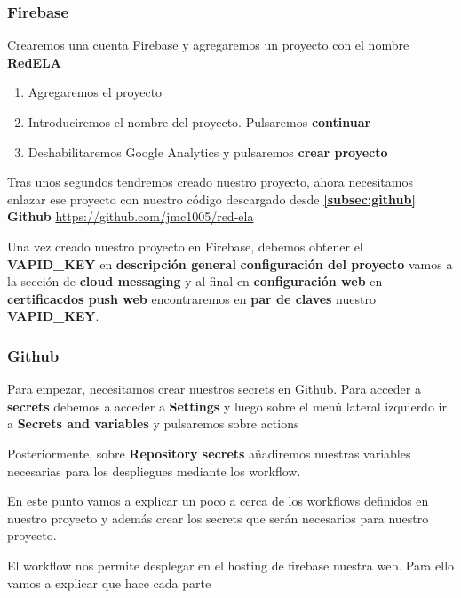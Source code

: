 \subsubsection{\label{subsec:firebase}Firebase}
Crearemos una cuenta Firebase y agregaremos un proyecto con el nombre \textbf{RedELA}
\begin{enumerate}
\item Agregaremos el proyecto 
\item Introduciremos el nombre del proyecto. Pulsaremos \textbf{continuar}
\item Deshabilitaremos Google Analytics y pulsaremos \textbf{crear proyecto}
\end{enumerate}

Tras unos segundos tendremos creado nuestro proyecto, ahora necesitamos enlazar ese proyecto con nuestro código descargado desde \textbf{\ref{subsec:github} Github} \url{https://github.com/jmc1005/red-ela}

Una vez creado nuestro proyecto en Firebase, debemos obtener el \textbf{VAPID\_KEY} en \textbf{descripción general} \textbf{configuración del proyecto} vamos a la sección de \textbf{cloud messaging} y al final en \textbf{configuración web} en \textbf{certificacdos push web} encontraremos en \textbf{par de claves} nuestro \textbf{VAPID\_KEY}.

\subsubsection{\label{subsec:github}Github}
Para empezar, necesitamos crear nuestros secrets en Github. Para acceder a \textbf{secrets} debemos a acceder a \textbf{Settings} y luego sobre el menú lateral izquierdo ir a \textbf{Secrets and variables} y pulsaremos sobre actions

Posteriormente, sobre \textbf{Repository secrets} añadiremos nuestras variables necesarias para los despliegues mediante los workflow.

En este punto vamos a explicar un poco a cerca de los workflows definidos en nuestro proyecto y además crear los secrets que serán necesarios para nuestro proyecto.

El workflow nos permite desplegar en el hosting de firebase nuestra web. Para ello vamos a explicar que hace cada parte

